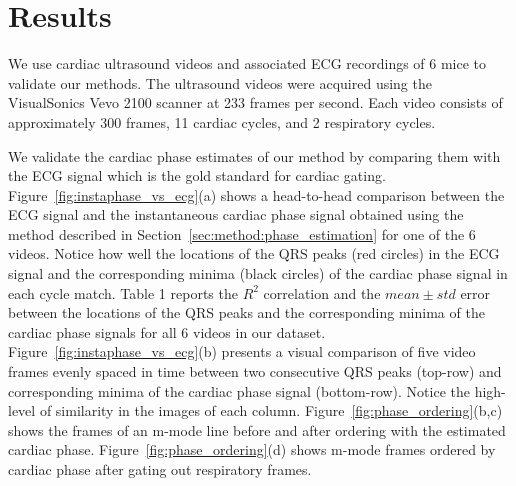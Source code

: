 \documentclass[runningheads,a4paper]{llncs}
\begin{document}
\section{Results}
\label{sec:results}
%
We use cardiac ultrasound videos and associated ECG recordings of 6 mice to validate our methods. The ultrasound videos were acquired using the VisualSonics Vevo 2100 scanner at 233 frames per second. Each video consists of approximately 300 frames, 11 cardiac cycles, and 2 respiratory cycles.

	We validate the cardiac phase estimates of our method by comparing them with the ECG signal which is the gold standard for cardiac gating. Figure~\ref{fig:instaphase_vs_ecg}(a) shows a head-to-head comparison between the ECG signal and the instantaneous cardiac phase signal obtained using the method described in Section~\ref{sec:method:phase_estimation} for one of the 6 videos. Notice how well the locations of the  QRS peaks (red circles) in the ECG signal and the corresponding minima (black circles) of the cardiac phase signal in each cycle match. Table 1 reports the $R^2$ correlation and the $mean \pm std$ error between the locations of the QRS peaks and the corresponding minima of the cardiac phase signals for all 6 videos in our dataset. Figure~\ref{fig:instaphase_vs_ecg}(b) presents a visual comparison of five video frames evenly spaced in time between two consecutive QRS peaks (top-row) and corresponding minima of the cardiac phase signal (bottom-row). Notice the high-level of similarity in the images of each column.  Figure~\ref{fig:phase_ordering}(b,c) shows the frames of an m-mode line before and after ordering with the estimated cardiac phase. Figure~\ref{fig:phase_ordering}(d) shows m-mode frames ordered by cardiac phase after gating out respiratory frames. 
	
\end{document}

